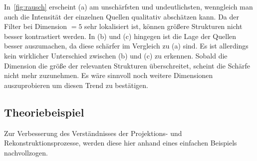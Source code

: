 \documentclass[slug=PET, room=Andreas-Schubert-Bau\,\ 424A, supervisor=Carsten\ Bittrich, coursedate=10.\ 01.\ 2020]{../../Lab_Report_LaTeX/lab_report}
\begin{document}
In~\ref{fig:rausch} erscheint (a) am unschärfsten und undeutlichsten,
wenngleich man auch die Intensität der einzelnen Quellen qualitativ
abschätzen kann. Da der Filter bei Dimension \(=5\) sehr lokalisiert
ist, k\"onnen gr\"o\ss{}ere Strukturen nicht besser kontrastiert
werden. In (b) und (c) hingegen ist die Lage der Quellen besser
auszumachen, da diese schärfer im Vergleich zu (a) sind. Es ist
allerdings kein wirklicher Unterschied zwischen (b) und (c) zu
erkennen. Sobald die Dimension die gr\"o\ss{}e der relevanten
Strukturen \"uberschreitet, scheint die Sch\"arfe nicht mehr
zuzunehmen. Es w\"are sinnvoll noch weitere Dimensionen auszuprobieren
um diesen Trend zu best\"atigen.



\subsection{Theoriebeispiel}
\label{sec:theobei}
Zur Verbesserung des Verst\"andnisses der Projektions- und
Rekonstruktionsprozesse, werden diese hier anhand eines einfachen
Beispiels nachvollzogen.
\end{document}
